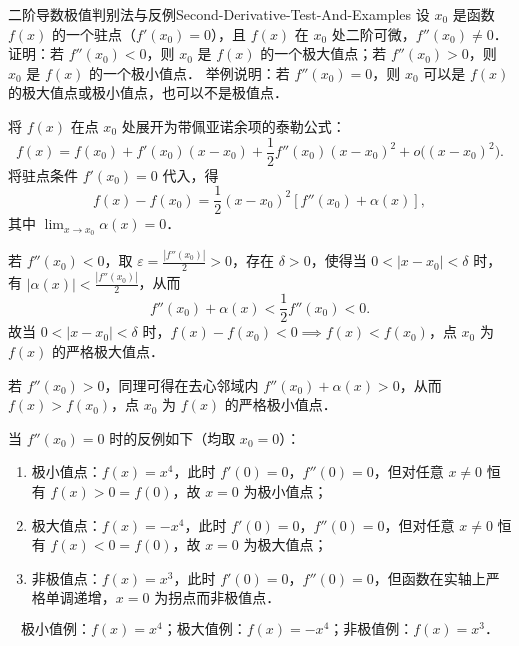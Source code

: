 \begin{problem}{二阶导数极值判别法与反例}{Second-Derivative-Test-And-Examples}
    设 $x_0$ 是函数 $f(x)$ 的一个驻点（$f'(x_0) = 0$），且 $f(x)$ 在 $x_0$ 处二阶可微，$f''(x_0) \neq 0$．证明：若 $f''(x_0) < 0$，则 $x_0$ 是 $f(x)$ 的一个极大值点；若 $f''(x_0) > 0$，则 $x_0$ 是 $f(x)$ 的一个极小值点．
    举例说明：若 $f''(x_0) = 0$，则 $x_0$ 可以是 $f(x)$ 的极大值点或极小值点，也可以不是极值点．
\end{problem}

\begin{solution}
    将 $f(x)$ 在点 $x_0$ 处展开为带佩亚诺余项的泰勒公式：
    \begin{equation}
        f(x) = f(x_0) + f'(x_0)(x - x_0) + \frac{1}{2}f''(x_0)(x - x_0)^2 + o\bigl((x - x_0)^2\bigr).
    \end{equation}
    将驻点条件 $f'(x_0) = 0$ 代入，得
    \begin{equation}
        f(x) - f(x_0) = \frac{1}{2}(x - x_0)^2 \left[ f''(x_0) + \alpha(x) \right],
    \end{equation}
    其中 $\lim_{x\to x_0} \alpha(x) = 0$．

    若 $f''(x_0) < 0$，取 $\varepsilon = \frac{|f''(x_0)|}{2} > 0$，存在 $\delta > 0$，使得当 $0 < |x - x_0| < \delta$ 时，有 $|\alpha(x)| < \frac{|f''(x_0)|}{2}$，从而
    \begin{equation}
        f''(x_0) + \alpha(x) < \frac{1}{2}f''(x_0) < 0.
    \end{equation}
    故当 $0 < |x - x_0| < \delta$ 时，$f(x) - f(x_0) < 0 \implies f(x) < f(x_0)$，点 $x_0$ 为 $f(x)$ 的严格极大值点．

    若 $f''(x_0) > 0$，同理可得在去心邻域内 $f''(x_0) + \alpha(x) > 0$，从而 $f(x) > f(x_0)$，点 $x_0$ 为 $f(x)$ 的严格极小值点．

    当 $f''(x_0) = 0$ 时的反例如下（均取 $x_0 = 0$）：
    \begin{enumerate}
        \item 极小值点：$f(x) = x^4$，此时 $f'(0) = 0$，$f''(0) = 0$，但对任意 $x \neq 0$ 恒有 $f(x) > 0 = f(0)$，故 $x = 0$ 为极小值点；
        \item 极大值点：$f(x) = -x^4$，此时 $f'(0) = 0$，$f''(0) = 0$，但对任意 $x \neq 0$ 恒有 $f(x) < 0 = f(0)$，故 $x = 0$ 为极大值点；
        \item 非极值点：$f(x) = x^3$，此时 $f'(0) = 0$，$f''(0) = 0$，但函数在实轴上严格单调递增，$x = 0$ 为拐点而非极值点．
    \end{enumerate}
    \begin{equation}
        \boxed{\text{极小值例：} f(x) = x^4；\text{极大值例：} f(x) = -x^4；\text{非极值例：} f(x) = x^3．}
    \end{equation}
\end{solution}

